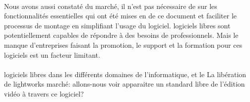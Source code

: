\paragraph{}

Nous avons aussi constaté %
du marché, il n'est pas nécessaire %
de %
sur les fonctionnalités essentielles qui ont été mises en %
de ce document et faciliter le processus de montage en
simplifiant l'usage du logiciel. %
logiciels libres sont potentiellement capables de répondre à des besoins
de professionnels.  Mais le manque d'entreprises faisant la promotion,
le support et la formation pour ces logiciels est un facteur limitant.
%
\paragraph{}

logiciels libres dans les différents domaines de l'informatique, et
le %
La libération de lightworks %
marché: allons-nous voir apparaitre un standard libre de l'édition
vidéo à travers ce logiciel?
